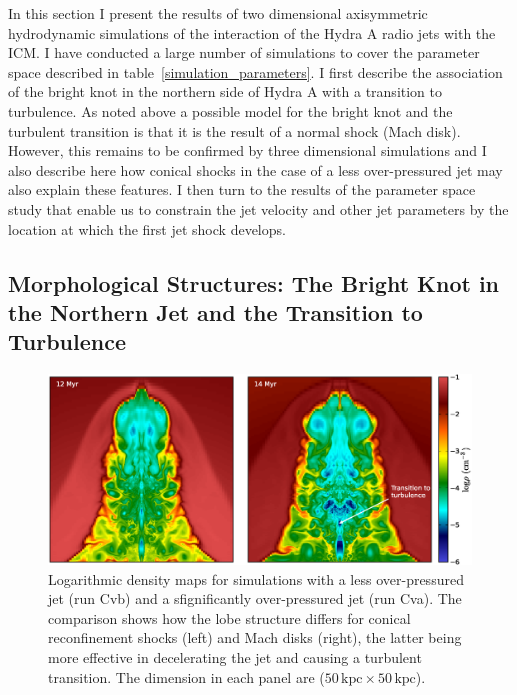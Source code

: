 In this section I present the results of two dimensional axisymmetric hydrodynamic simulations of the interaction of the Hydra A radio jets with the ICM. I have conducted a large number of simulations to cover the parameter space described in table~\ref{simulation_parameters}. I first describe the association of the bright knot in the northern side of Hydra A with a transition to turbulence. As noted above a possible model for the bright knot and the turbulent transition is that it is the result of a normal shock (Mach disk). However, this remains to be confirmed by three dimensional simulations and I also describe here how conical shocks in the case of a less over-pressured jet may also explain these features. I then turn to the results of the parameter space study that enable us to constrain the jet velocity and other jet parameters by the location at which the first jet shock develops.

%
%
\subsection{Morphological Structures: The Bright Knot in the Northern Jet and the Transition to Turbulence}\label{morphological_structure}
\begin{figure}
\centering
\includegraphics[width=\linewidth]{pls.eps}
\caption{Logarithmic density maps for simulations with a less over-pressured jet (run Cvb) and a sfignificantly over-pressured jet (run Cva). The comparison shows how the lobe structure differs for conical reconfinement shocks (left) and Mach disks (right), the latter being more effective in decelerating the jet and causing a turbulent transition. The dimension in each panel are ($50\,\mathrm{kpc}\times50\,\mathrm{kpc}$).}
\label{shock_comparison}
\end{figure}


